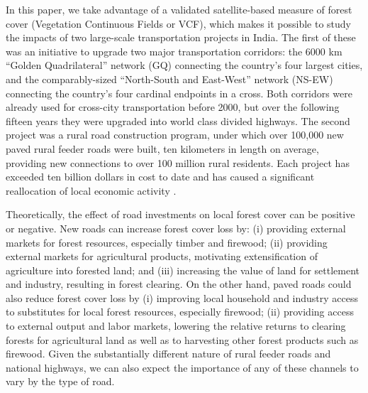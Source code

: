 In this paper, we take advantage of a validated satellite-based
measure of forest cover (Vegetation Continuous Fields or VCF), which
makes it possible to study the impacts of two large-scale
transportation projects in India.  The first of these was an
initiative to upgrade two major transportation corridors: the 6000 km
``Golden Quadrilateral'' network (GQ) connecting the country's four
largest cities, and the comparably-sized ``North-South and East-West''
network (NS-EW) connecting the country's four cardinal endpoints in a
cross. Both corridors were already used for cross-city transportation
before 2000, but over the following fifteen years they were upgraded
into world class divided highways.  The second project was a rural
road construction program, under which over 100,000 new paved rural
feeder roads were built, ten kilometers in length on average,
providing new connections to over 100 million rural residents. Each
project has exceeded ten billion dollars in cost to date and has
caused a significant reallocation of local economic activity
\cite{AN17,GGK16}.

Theoretically, the effect of road investments on local forest cover can be
positive or negative.  New roads can increase forest cover loss by:
(i) providing external markets for forest resources, especially timber
and firewood; (ii) providing external markets for agricultural
products, motivating extensification of agriculture into forested
land; and (iii) increasing the value of land for settlement and
industry, resulting in forest clearing.  On the other hand, paved
roads could also reduce forest cover loss by (i) improving local
household and industry access to substitutes for local forest
resources, especially firewood; (ii) providing access to external
output and labor markets, lowering the relative returns to clearing
forests for agricultural land as well as to harvesting other forest
products such as firewood. Given the substantially different nature of
rural feeder roads and national highways, we can also expect the
importance of any of these channels to vary by the type of
road. 

